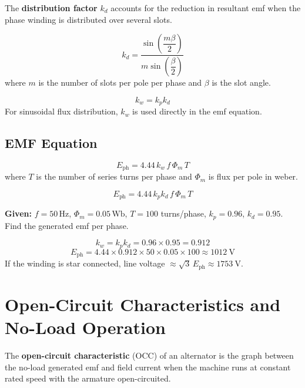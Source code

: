 \documentclass[12pt,a4paper]{article}
\newcommand{\Eph}{E_{\mathrm{ph}}}
\newcommand{\Phim}{\Phi_m}
\newcommand{\kp}{k_p}
\newcommand{\kd}{k_d}
\newcommand{\kw}{k_w}
\begin{document}
\begin{definebox}
The \textbf{distribution factor} \(\kd\) accounts for the reduction in resultant emf when the phase winding is distributed over several slots.
\end{definebox}

\begin{formulabox}
\[
  \kd = \frac{\sin\left(\dfrac{m\beta}{2}\right)}{m\sin\left(\dfrac{\beta}{2}\right)}
\]
where \(m\) is the number of slots per pole per phase and \(\beta\) is the slot angle.
\end{formulabox}

\begin{importantbox}
\[
  \kw = \kp \kd
\]
For sinusoidal flux distribution, \(\kw\) is used directly in the emf equation.
\end{importantbox}

\subsection{EMF Equation}

\begin{formulabox}
\[
  \Eph = 4.44 \, \kw \, f \, \Phim \, T
\]
where \(T\) is the number of series turns per phase and \(\Phim\) is flux per pole in weber.
\end{formulabox}

\[
  \Eph = 4.44 \, \kp \kd \, f \, \Phim \, T
\]

\begin{examplebox}
\textbf{Given:} \(f = 50\,\mathrm{Hz}\), \(\Phim = 0.05\,\mathrm{Wb}\), \(T = 100\) turns/phase,
\(\kp = 0.96\), \(\kd = 0.95\). Find the generated emf per phase.

\[
  \kw = \kp\kd = 0.96 \times 0.95 = 0.912
\]
\[
  \Eph = 4.44 \times 0.912 \times 50 \times 0.05 \times 100
  \approx 1012\ \mathrm{V}
\]
If the winding is star connected, line voltage \(\approx \sqrt{3}\,\Eph \approx 1753\ \mathrm{V}\).
\end{examplebox}

\section{Open-Circuit Characteristics and No-Load Operation}

\begin{definebox}
The \textbf{open-circuit characteristic} (OCC) of an alternator is the graph between the no-load generated emf and field current when the machine runs at constant rated speed with the armature open-circuited.
\end{definebox}
\end{document}
